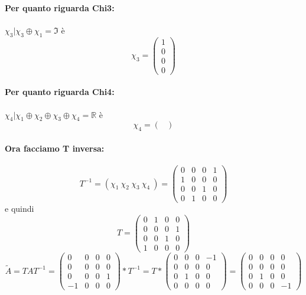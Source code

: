 \documentclass{article}
\begin{document}
\paragraph{Per quanto riguarda Chi3:} $ \chi_3 | \chi_3 \oplus \chi_1 = \mathfrak{I} $ è \[ \chi_3 = \left(\begin{matrix}1\\0\\0\\0\end{matrix}\right) \]

\paragraph{Per quanto riguarda Chi4:} $ \chi_4 | \chi_1 \oplus \chi_2 \oplus  \chi_3 \oplus \chi_4 = \mathbb{R} $ è \[ \chi_4 = \left(\begin{matrix}\end{matrix}\right) \]
\paragraph{Ora facciamo T inversa:} \[ T^{-1} = (\chi_1\ \chi_2\ \chi_3\ \chi_4\ ) = \left(\begin{matrix}0 & 0 & 0 & 1\\1 & 0 & 0 & 0\\0 & 0 & 1 & 0\\0 & 1 & 0 & 0\end{matrix}\right) \]
e quindi \[T = \left(\begin{matrix}0 & 1 & 0 & 0\\0 & 0 & 0 & 1\\0 & 0 & 1 & 0\\1 & 0 & 0 & 0\end{matrix}\right)\]
\[ \widetilde{A} = TAT^{-1} = \left(\begin{matrix}0 & 0 & 0 & 0\\0 & 0 & 0 & 0\\0 & 0 & 0 & 1\\-1 & 0 & 0 & 0\end{matrix}\right) * T^{-1} = T*\left(\begin{matrix}0 & 0 & 0 & -1\\0 & 0 & 0 & 0\\0 & 1 & 0 & 0\\0 & 0 & 0 & 0\end{matrix}\right) =\left(\begin{matrix}0 & 0 & 0 & 0\\0 & 0 & 0 & 0\\0 & 1 & 0 & 0\\0 & 0 & 0 & -1\end{matrix}\right) \]
\end{document}
